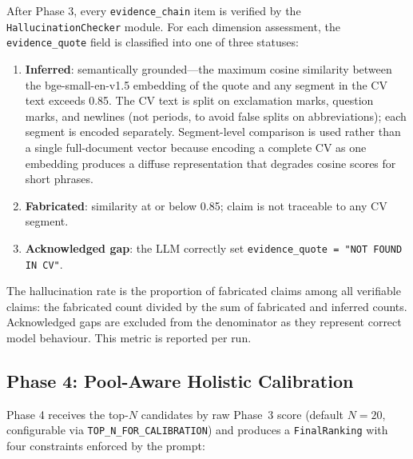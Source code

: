 \documentclass[journal]{IEEEtran}
\begin{document}
After Phase 3, every \texttt{evidence\_chain} item is verified by the
\texttt{HallucinationChecker} module. For each dimension assessment, the
\texttt{evidence\_quote} field is classified into one of three statuses:

\begin{enumerate}
  \item \textbf{Inferred}: semantically grounded—the maximum cosine similarity
        between the bge-small-en-v1.5 embedding of the quote and any segment in
        the CV text exceeds 0.85. The CV text is split on exclamation marks,
        question marks, and newlines (not periods, to avoid false splits on
        abbreviations); each segment is encoded separately. Segment-level
        comparison is used rather than a single full-document vector because
        encoding a complete CV as one embedding produces a diffuse
        representation that degrades cosine scores for short phrases.
  \item \textbf{Fabricated}: similarity at or below 0.85; claim is not
        traceable to any CV segment.
  \item \textbf{Acknowledged gap}: the LLM correctly set
        \texttt{evidence\_quote = "NOT FOUND IN CV"}.
\end{enumerate}

The hallucination rate is the proportion of fabricated claims among all verifiable
claims: the fabricated count divided by the sum of fabricated and inferred counts.
Acknowledged gaps are excluded from the denominator as they represent correct
model behaviour. This metric is reported per run.

\subsection{Phase 4: Pool-Aware Holistic Calibration}
\label{subsec:phase4}

Phase 4 receives the top-$N$ candidates by raw Phase~3 score (default
$N = 20$, configurable via \texttt{TOP\_N\_FOR\_CALIBRATION}) and produces a
\texttt{FinalRanking} with four constraints enforced by the prompt:
\end{document}

